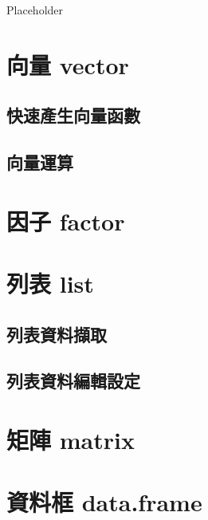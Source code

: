 \documentclass[
]{book}
\begin{document}
Placeholder

\hypertarget{ux5411ux91cf-vector}{%
\section{向量 vector}\label{ux5411ux91cf-vector}}

\hypertarget{ux5febux901fux7522ux751fux5411ux91cfux51fdux6578}{%
\subsection{快速產生向量函數}\label{ux5febux901fux7522ux751fux5411ux91cfux51fdux6578}}

\hypertarget{ux5411ux91cfux904bux7b97}{%
\subsection{向量運算}\label{ux5411ux91cfux904bux7b97}}

\hypertarget{ux56e0ux5b50-factor}{%
\section{因子 factor}\label{ux56e0ux5b50-factor}}

\hypertarget{ux5217ux8868-list}{%
\section{列表 list}\label{ux5217ux8868-list}}

\hypertarget{ux5217ux8868ux8cc7ux6599ux64f7ux53d6}{%
\subsection{列表資料擷取}\label{ux5217ux8868ux8cc7ux6599ux64f7ux53d6}}

\hypertarget{ux5217ux8868ux8cc7ux6599ux7de8ux8f2fux8a2dux5b9a}{%
\subsection{列表資料編輯設定}\label{ux5217ux8868ux8cc7ux6599ux7de8ux8f2fux8a2dux5b9a}}

\hypertarget{ux77e9ux9663-matrix}{%
\section{矩陣 matrix}\label{ux77e9ux9663-matrix}}

\hypertarget{ux8cc7ux6599ux6846-data.frame}{%
\section{資料框 data.frame}\label{ux8cc7ux6599ux6846-data.frame}}
\end{document}
